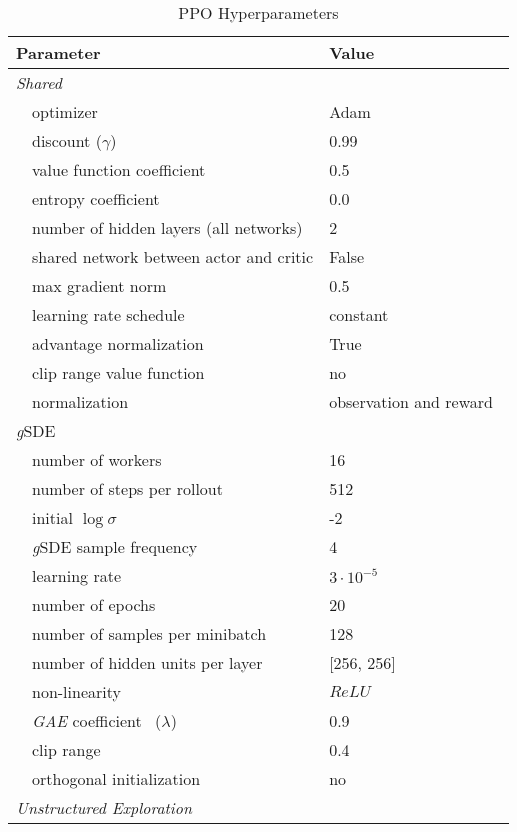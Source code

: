 \documentclass{article}
\newcommand{\ourSDE}{\textit{g}\textsc{SDE}\xspace}
\newcommand{\ppo}{\textsc{PPO}\xspace}
\begin{document}
\begin{table}[h]
\renewcommand{\arraystretch}{1.1}
\centering
\caption{\ppo Hyperparameters}
\label{tab:ppo_shared_params}
\vspace{1mm}
  \begin{tabular}{@{}l l| l@{}}
    \toprule
    \multicolumn{2}{l|}{Parameter} &  Value\\
    \midrule
    \multicolumn{2}{l|}{\textit{Shared}}& \\
    & optimizer & Adam~\citep{kingma2014adam}\\
    & discount ($\gamma$) &  0.99\\
    & value function coefficient & 0.5\\
    & entropy coefficient & 0.0\\
    & number of hidden layers (all networks) & 2\\
    & shared network between actor and critic & False\\
    & max gradient norm & 0.5\\
    & learning rate schedule & constant \\
    & advantage normalization~\citep{hill2018stable} & True \\
    & clip range value function~\citep{engstrom2020implementation} & no \\
    & normalization & observation and reward~\citep{hill2018stable}\\
    \midrule
    \multicolumn{2}{l|}{\ourSDE}& \\
    & number of workers &  16\\
    & number of steps per rollout &  512\\
    & initial $\log \sigma$ & -2\\
    & \ourSDE sample frequency & 4\\
    & learning rate & $3 \cdot 10^{-5}$\\
    & number of epochs & 20\\
    & number of samples per minibatch & 128\\
    & number of hidden units per layer & [256, 256]\\
    & non-linearity & $ReLU$\\
    & \textit{GAE} coefficient~\citep{schulman2015high} ($\lambda$) &  0.9\\
    & clip range & 0.4 \\
    & orthogonal initialization~\citep{engstrom2020implementation} & no \\
    \midrule
    \multicolumn{2}{l|}{\textit{Unstructured Exploration}}& \\

\end{tabular}
\end{table}
\end{document}
